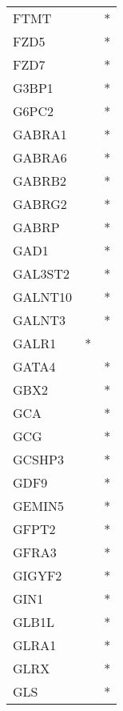 \begin{longtable}{lcc}
FTMT            &                &          * \\
FZD5            &                &          * \\
FZD7            &                &          * \\
G3BP1           &                &          * \\
G6PC2           &                &          * \\
GABRA1          &                &          * \\
GABRA6          &                &          * \\
GABRB2          &                &          * \\
GABRG2          &                &          * \\
GABRP           &                &          * \\
GAD1            &                &          * \\
GAL3ST2         &                &          * \\
GALNT10         &                &          * \\
GALNT3          &                &          * \\
GALR1           &              * &            \\
GATA4           &                &          * \\
GBX2            &                &          * \\
GCA             &                &          * \\
GCG             &                &          * \\
GCSHP3          &                &          * \\
GDF9            &                &          * \\
GEMIN5          &                &          * \\
GFPT2           &                &          * \\
GFRA3           &                &          * \\
GIGYF2          &                &          * \\
GIN1            &                &          * \\
GLB1L           &                &          * \\
GLRA1           &                &          * \\
GLRX            &                &          * \\
GLS             &                &          * \\

\end{longtable}
